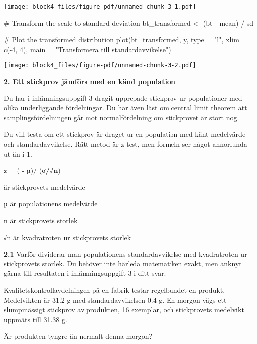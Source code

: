 \documentclass[
  letterpaper,
  DIV=11,
  numbers=noendperiod]{scrartcl}
\newenvironment{Shaded}{\begin{snugshade}}{\end{snugshade}}
\newcommand{\AttributeTok}[1]{\textcolor[rgb]{0.40,0.45,0.13}{#1}}
\newcommand{\CommentTok}[1]{\textcolor[rgb]{0.37,0.37,0.37}{#1}}
\newcommand{\DecValTok}[1]{\textcolor[rgb]{0.68,0.00,0.00}{#1}}
\newcommand{\FunctionTok}[1]{\textcolor[rgb]{0.28,0.35,0.67}{#1}}
\newcommand{\NormalTok}[1]{\textcolor[rgb]{0.00,0.23,0.31}{#1}}
\newcommand{\OtherTok}[1]{\textcolor[rgb]{0.00,0.23,0.31}{#1}}
\newcommand{\SpecialCharTok}[1]{\textcolor[rgb]{0.37,0.37,0.37}{#1}}
\newcommand{\StringTok}[1]{\textcolor[rgb]{0.13,0.47,0.30}{#1}}
\begin{document}
\texttt{[image: block4\_files/figure-pdf/unnamed-chunk-3-1.pdf]}

\begin{Shaded}
\begin{Highlighting}[]
\CommentTok{\# Transform the scale to standard deviation}
\NormalTok{bt\_transformed }\OtherTok{\textless{}{-}}\NormalTok{ (bt }\SpecialCharTok{{-}}\NormalTok{ mean) }\SpecialCharTok{/}\NormalTok{ sd}

\CommentTok{\# Plot the transformed distribution}
\FunctionTok{plot}\NormalTok{(bt\_transformed, y, }\AttributeTok{type =} \StringTok{"l"}\NormalTok{, }\AttributeTok{xlim =} \FunctionTok{c}\NormalTok{(}\SpecialCharTok{{-}}\DecValTok{4}\NormalTok{, }\DecValTok{4}\NormalTok{), }\AttributeTok{main =} \StringTok{"Transformera till standardavvikelse"}\NormalTok{)}
\end{Highlighting}
\end{Shaded}

\texttt{[image: block4\_files/figure-pdf/unnamed-chunk-3-2.pdf]}

\textbf{2. Ett stickprov jämförs med en känd population}

Du har i inlämningsuppgift 3 dragit upprepade stickprov ur populationer
med olika underliggande fördelningar. Du har även läst om central limit
theorem att samplingsfördelningen går mot normalfördelning om
stickprovet är stort nog.

Du vill testa om ett stickprov är draget ur en population med känt
medelvärde och standardavvikelse. Rätt metod är z-test, men formeln ser
något annorlunda ut än i 1.

z = ( - µ)/ (σ\textbf{/√n})

är stickprovets medelvärde

µ är populationens medelvärde

n är stickprovets storlek

√n är kvadratroten ur stickprovets storlek

\textbf{2.1} Varför dividerar man populationens standardavvikelse med
kvadratroten ur stickprovets storlek. Du behöver inte härleda
matematiken exakt, men anknyt gärna till resultaten i inlämningsuppgift
3 i ditt svar.

Kvalitetskontrollavdelningen på en fabrik testar regelbundet en produkt.
Medelvikten är 31.2 g med standardavvikelsen 0.4 g. En morgon vägs ett
slumpmässigt stickprov av produkten, 16 exemplar, och stickprovets
medelvikt uppmäts till 31.38 g.

Är produkten tyngre än normalt denna morgon?
\end{document}
